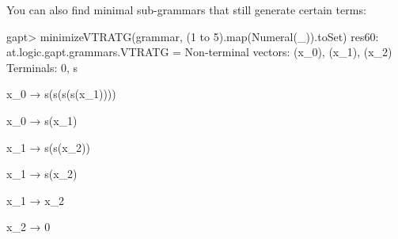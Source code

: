 \documentclass[a4paper,11pt]{book}
\begin{document}
You can also find minimal sub-grammars that still generate certain terms:
\begin{clilisting}
gapt> minimizeVTRATG(grammar, (1 to 5).map(Numeral(_)).toSet)
res60: at.logic.gapt.grammars.VTRATG =
Non-terminal vectors: (x_0), (x_1), (x_2)
Terminals: 0, s

x_0 → s(s(s(s(x_1))))

x_0 → s(x_1)

x_1 → s(s(x_2))

x_1 → s(x_2)

x_1 → x_2

x_2 → 0

\end{clilisting}





\vfill
\pagebreak
\end{document}
